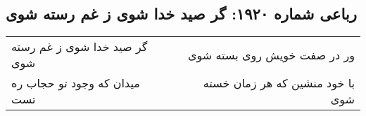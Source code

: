 \begin{center}
\section*{رباعی شماره ۱۹۲۰: گر صید خدا شوی ز غم رسته شوی}
\label{sec:1920}
\begin{longtable}{l p{0.5cm} r}
گر صید خدا شوی ز غم رسته شوی
&&
ور در صفت خویش روی بسته شوی
\\
میدان که وجود تو حجاب ره تست
&&
با خود منشین که هر زمان خسته شوی
\\
\end{longtable}
\end{center}
